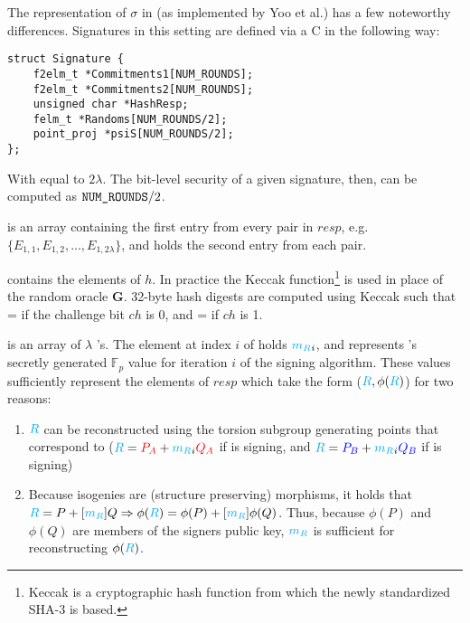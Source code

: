 \vspace{10px}
\noindent
The representation of $\sigma$ in \sidh (as implemented by Yoo et al.) has a few noteworthy differences. Signatures in this setting are defined via a C  in the following way:\\

\begin{lstlisting}
struct Signature {
	f2elm_t *Commitments1[NUM_ROUNDS];
	f2elm_t *Commitments2[NUM_ROUNDS];
	unsigned char *HashResp;
	felm_t *Randoms[NUM_ROUNDS/2];
	point_proj *psiS[NUM_ROUNDS/2];
};
\end{lstlisting}
\vspace{15px}

With  equal to $2\lambda$. The bit-level security of a given signature, then, can be computed as $\texttt{NUM\_ROUNDS}/2$.

 is an array containing the first entry from every pair in $resp$, e.g.\ $\{E_{1,1}, E_{1,2}, ..., E_{1,2\lambda}\}$, and  holds the second entry from each pair. 

 contains the elements of $h$. In practice the Keccak function\footnote{Keccak is a cryptographic hash function from which the newly standardized SHA-3 is based.} is used in place of the random oracle \textbf{G}. 32-byte hash digests are computed using Keccak such that  =  if the challenge bit $ch$ is 0, and  =  if $ch$ is 1.

 is an array of $\lambda$ 's. The element at index $i$ of  holds $\textcolor{cyan}{m_R}_{i}$, and represents \randall's secretly generated $\mathbb{F}_{p}$ value for iteration $i$ of the signing algorithm. These values sufficiently represent the elements of $resp$ which take the form ($\textcolor{cyan}{R}, \phi(\textcolor{cyan}{R})$) for two reasons: 
\begin{enumerate}
\item $\textcolor{cyan}{R}$ can be reconstructed using the torsion subgroup generating points that correspond to \randall ($\textcolor{cyan}{R} = \textcolor{red}{P_A} + \textcolor{cyan}{m_R}_{i}\textcolor{red}{Q_A}$ if \bob is signing, and $\textcolor{cyan}{R} = \textcolor{blue}{P_B} + \textcolor{cyan}{m_R}_{i}\textcolor{blue}{Q_B}$ if \alice is signing)
\item Because isogenies are (structure preserving) morphisms, it holds that $\textcolor{cyan}{R} = P + [\textcolor{cyan}{m_R}]Q \Rightarrow \phi(\textcolor{cyan}{R}) = \phi(P) + [\textcolor{cyan}{m_R}]\phi(Q)$. Thus, because $\phi(P)$ and $\phi(Q)$ are members of the signers public key, $\textcolor{cyan}{m_R}$ is sufficient for reconstructing $\phi(\textcolor{cyan}{R})$.
\end{enumerate}

